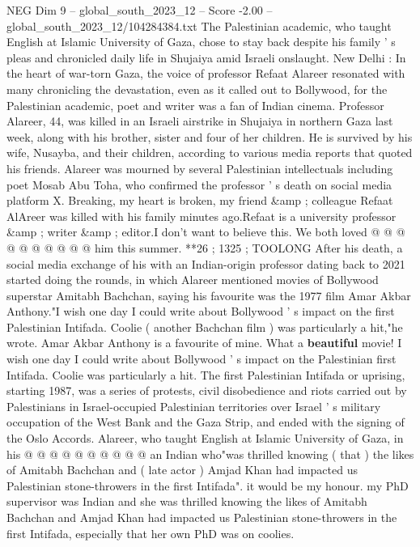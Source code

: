 \begin{textsample}{NEG Dim 9 – global\_south\_2023\_12 – Score -2.00 – global\_south\_2023\_12/104284384.txt}  \label{ex:f9_neg_436}
The Palestinian academic, who taught English at Islamic University of Gaza, chose to stay back despite his family ' s pleas and chronicled daily life in Shujaiya amid Israeli onslaught.
New Delhi : In the heart of war-torn Gaza, the voice of professor Refaat Alareer resonated with many chronicling the devastation, even as it called out to Bollywood, for the Palestinian academic, poet and writer was a fan of Indian cinema.
Professor Alareer, 44, was killed in an Israeli airstrike in Shujaiya in northern Gaza last week, along with his brother, sister and four of her children.
He is survived by his wife, Nusayba, and their children, according to various media reports that quoted his friends.
Alareer was mourned by several Palestinian intellectuals including poet Mosab Abu Toha, who confirmed the professor ' s death on social media platform X.
Breaking, my heart is broken, my friend \&amp ; colleague Refaat AlAreer was killed with his family minutes ago.Refaat is a university professor \&amp ; writer \&amp ; editor.I don't want to believe this.
We both loved @ @ @ @ @ @ @ @ @ @ him this summer. **26 ; 1325 ; TOOLONG After his death, a social media exchange of his with an Indian-origin professor dating back to 2021 started doing the rounds, in which Alareer mentioned movies of Bollywood superstar Amitabh Bachchan, saying his favourite was the 1977 film Amar Akbar Anthony."I wish one day I could write about Bollywood ' s impact on the first Palestinian Intifada.
Coolie ( another Bachchan film ) was particularly a hit,"he wrote.
Amar Akbar Anthony is a favourite of mine.
What a \textbf{beautiful} movie!
I wish one day I could write about Bollywood ' s impact on the Palestinian first Intifada.
Coolie was particularly a hit.
The first Palestinian Intifada or uprising, starting 1987, was a series of protests, civil disobedience and riots carried out by Palestinians in Israel-occupied Palestinian territories over Israel ' s military occupation of the West Bank and the Gaza Strip, and ended with the signing of the Oslo Accords.
Alareer, who taught English at Islamic University of Gaza, in his @ @ @ @ @ @ @ @ @ @ an Indian who"was thrilled knowing ( that ) the likes of Amitabh Bachchan and ( late actor ) Amjad Khan had impacted us Palestinian stone-throwers in the first Intifada". it would be my honour. my PhD supervisor was Indian and she was thrilled knowing the likes of Amitabh Bachchan and Amjad Khan had impacted us Palestinian stone-throwers in the first Intifada, especially that her own PhD was on coolies.

\end{textsample}
